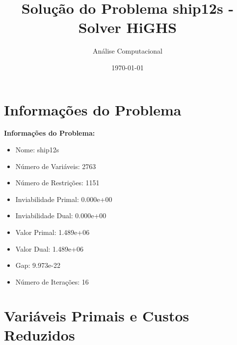 \documentclass[12pt]{article}
\title{Solução do Problema ship12s - Solver HiGHS}
\author{Análise Computacional}
\date{\today}
\begin{document}
\maketitle

\section{Informações do Problema}

\textbf{Informações do Problema:}
\begin{itemize}
\item Nome: ship12s
\item Número de Variáveis: 2763
\item Número de Restrições: 1151
\item Inviabilidade Primal: 0.000e+00
\item Inviabilidade Dual: 0.000e+00
\item Valor Primal: 1.489e+06
\item Valor Dual: 1.489e+06
\item Gap: 9.973e-22
\item Número de Iterações: 16
\end{itemize}


\section{Variáveis Primais e Custos Reduzidos}
\end{document}
